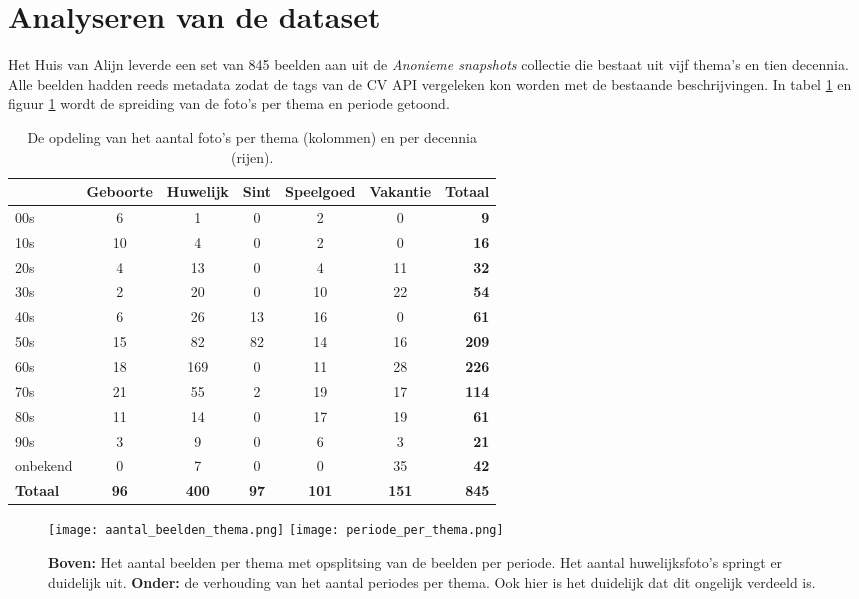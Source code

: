 \section{Analyseren van de dataset}
\label{sec:analyseren-van-de-dataset}

Het Huis van Alijn leverde een set van 845 beelden aan uit de \textit{Anonieme snapshots} collectie die bestaat uit vijf thema’s en tien decennia. Alle beelden hadden reeds metadata zodat de tags van de CV API vergeleken kon worden met de bestaande beschrijvingen. In tabel  \ref{tab:analyse-dataset} en figuur \ref{fig:verhouding-beelden-thema} wordt de spreiding van de foto’s per thema en periode getoond.

\begin{table}
	\centering
	\renewcommand\arraystretch{1.2}
	\begin{tabular}{l|ccccc|r}
		\toprule
		& Geboorte & Huwelijk & Sint & Speelgoed & Vakantie & Totaal \\
		\midrule
		00s & 6 & 1 & 0 &2 & 0 & \textbf{9} \\
		10s & 10 & 4 & 0 & 2 & 0 & \textbf{16} \\
		20s & 4 & 13 & 0 & 4 & 11 & \textbf{32} \\
		30s & 2 & 20 & 0 & 10 & 22 & \textbf{54} \\
		40s & 6 & 26 & 13 & 16 & 0 & \textbf{61} \\
		50s & 15 & 82 & 82 & 14 & 16 & \textbf{209} \\
		60s & 18 & 169 & 0 & 11 & 28 & \textbf{226} \\
		70s & 21 & 55 & 2 & 19 & 17 & \textbf{114} \\
		80s & 11 & 14 & 0 & 17 & 19 & \textbf{61} \\
		90s & 3 & 9 & 0 & 6 & 3 & \textbf{21} \\
		onbekend & 0 & 7 & 0 & 0 & 35 & \textbf{42} \\
		\midrule
		\textbf{Totaal} & \textbf{96} & \textbf{400} & \textbf{97} & \textbf{101} & \textbf{151} & \textbf{845} \\
		\bottomrule
	\end{tabular}
	\caption[opdeling van het aantal foto’s per thema en decennia]{De opdeling van het aantal foto’s per thema (kolommen) en per decennia (rijen).}
	\label{tab:analyse-dataset}
\end{table}

\begin{figure}
	\centering
	\texttt{[image: aantal\_beelden\_thema.png]}\hfill
	\texttt{[image: periode\_per\_thema.png]}\hfill
	\caption[Staafdiagrammen met het aantal beelden per thema en de verhouding van het aantal periodes per thema]{\textbf{Boven:} Het aantal beelden per thema met opsplitsing van de beelden per periode. Het aantal huwelijksfoto's springt er duidelijk uit. \textbf{Onder:} de verhouding van het aantal periodes per thema. Ook hier is het duidelijk dat dit ongelijk verdeeld is.}
	\label{fig:verhouding-beelden-thema}
\end{figure}

